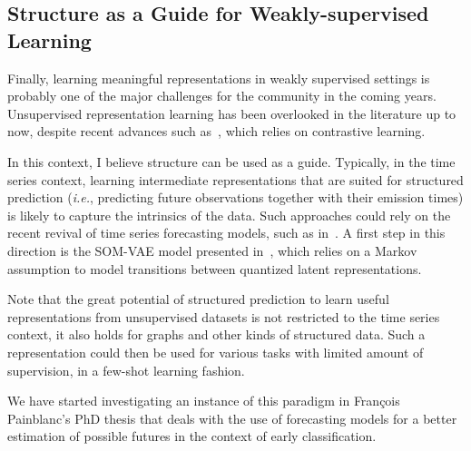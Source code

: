 \subsection{Structure as a Guide for Weakly-supervised Learning}

Finally, learning meaningful representations in weakly supervised settings is
probably one of the major challenges for the community in the coming years.
Unsupervised representation learning has been overlooked in the
literature up to now, despite recent advances such
as~\cite{franceschi2019unsupervised}, which relies on contrastive learning.

In this context, I believe structure can
be used as a guide.
Typically, in the time series context, learning intermediate representations
that are suited for structured prediction (\emph{i.e.}, predicting future
observations together with their emission times) is likely to capture the
intrinsics of the data.
Such approaches could rely on the recent revival of time series forecasting
models, such as in~\cite{vincent2019shape,rubanova2019latent}.
A first step in this direction is the SOM-VAE model presented
in~\cite{fortuin2019som}, which relies on a Markov assumption to model
transitions between quantized latent representations.

Note that the great potential of structured prediction to learn useful
representations from unsupervised datasets is not restricted to the time series
context, it also holds for graphs and other kinds of structured data.
Such a representation could then be used for various tasks with limited amount
of supervision, in a few-shot learning fashion.

We have started investigating an instance of this paradigm in François
Painblanc's PhD thesis that deals with the use of forecasting models for a
better estimation of possible futures in the context of early classification.
